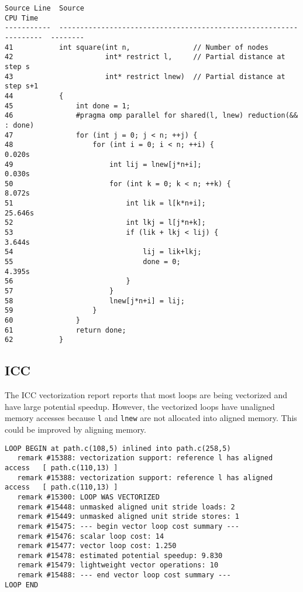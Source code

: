 {
\scriptsize
\begin{verbatim}
Source Line  Source                                                              CPU Time
-----------  ------------------------------------------------------------------  --------
41           int square(int n,               // Number of nodes
42                      int* restrict l,     // Partial distance at step s
43                      int* restrict lnew)  // Partial distance at step s+1
44           {
45               int done = 1;
46               #pragma omp parallel for shared(l, lnew) reduction(&& : done)
47               for (int j = 0; j < n; ++j) {
48                   for (int i = 0; i < n; ++i) {                                 0.020s
49                       int lij = lnew[j*n+i];                                    0.030s
50                       for (int k = 0; k < n; ++k) {                             8.072s
51                           int lik = l[k*n+i];                                  25.646s
52                           int lkj = l[j*n+k];
53                           if (lik + lkj < lij) {                                3.644s
54                               lij = lik+lkj;
55                               done = 0;                                         4.395s
56                           }
57                       }
58                       lnew[j*n+i] = lij;
59                   }
60               }
61               return done;
62           }
\end{verbatim}
}

\subsection{ICC}
The ICC vectorization report reports that most loops are being vectorized and
have large potential speedup. However, the vectorized loops have unaligned
memory accesses because \texttt{l} and \texttt{lnew} are not allocated into
aligned memory. This could be improved by aligning memory.

{
\scriptsize
\begin{verbatim}
LOOP BEGIN at path.c(108,5) inlined into path.c(258,5)
   remark #15388: vectorization support: reference l has aligned access   [ path.c(110,13) ]
   remark #15388: vectorization support: reference l has aligned access   [ path.c(110,13) ]
   remark #15300: LOOP WAS VECTORIZED
   remark #15448: unmasked aligned unit stride loads: 2
   remark #15449: unmasked aligned unit stride stores: 1
   remark #15475: --- begin vector loop cost summary ---
   remark #15476: scalar loop cost: 14
   remark #15477: vector loop cost: 1.250
   remark #15478: estimated potential speedup: 9.830
   remark #15479: lightweight vector operations: 10
   remark #15488: --- end vector loop cost summary ---
LOOP END
\end{verbatim}
}
